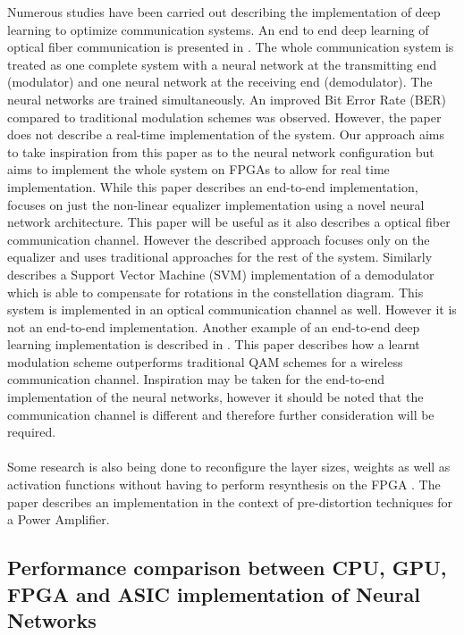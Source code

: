 Numerous studies have been carried out describing the implementation of deep learning to optimize communication systems. An end to end deep learning of optical fiber communication is presented in \autocite{8433895}. The whole communication system is treated as one complete system with a neural network at the transmitting end (modulator) and one neural network at the receiving end (demodulator). The neural networks are trained simultaneously. An improved Bit Error Rate (BER) compared to traditional modulation schemes was observed. However, the paper does not describe a real-time implementation of the system. Our approach aims to take inspiration from this paper as to the neural network configuration but aims to implement the whole system on FPGAs to allow for real time implementation. While this paper describes an end-to-end implementation, \autocite{6975096} focuses on just the non-linear equalizer implementation using a novel neural network architecture. This paper will be useful as it also describes a optical fiber communication channel. However the described approach focuses only on the equalizer and uses traditional approaches for the rest of the system. Similarly \autocite{8114893} describes a Support Vector Machine (SVM) implementation of a demodulator which is able to compensate for rotations in the constellation diagram. This system is implemented in an optical communication channel as well. However it is not an end-to-end implementation. Another example of an end-to-end deep learning implementation is described in \autocite{8664650}. This paper describes how a learnt modulation scheme outperforms traditional QAM schemes for a wireless communication channel. Inspiration may be taken for the end-to-end implementation of the neural networks, however it should be noted that the communication channel is different and therefore further consideration will be required. 
\\
\\
Some research is also being done to reconfigure the layer sizes, weights as well as activation functions without having to perform resynthesis on the FPGA \autocite{7824478}. The paper describes an implementation in the context of pre-distortion techniques for a Power Amplifier.



\subsection{Performance comparison between CPU, GPU, FPGA and ASIC implementation of Neural Networks}
\label{sec:cpu_gpu_fpga_asic}

